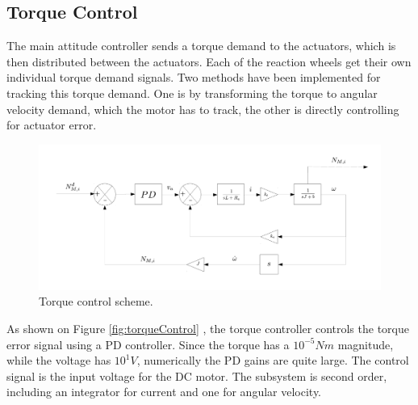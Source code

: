 \subsection{Torque Control}

The main attitude controller sends a torque demand to the actuators, which is then distributed between the actuators. Each of the reaction wheels get their own individual torque demand signals. Two methods have been implemented for tracking this torque demand. One is by transforming the torque to angular velocity demand, which the motor has to track, the other is directly controlling for actuator error.

\begin{figure}[h!]
	\centering 
	\includegraphics[width=170mm]{figures/torqueControl.pdf}	
	\caption{Torque control scheme.}
	\label{label{fig:torqueControl}}
\end{figure}

As shown on Figure \ref{fig:torqueControl} , the torque controller controls the torque error signal using a PD controller. Since the torque has a $ 10^{-5} Nm$ magnitude, while the voltage has $ 10^1 V$, numerically the PD gains are quite large. The control signal is the input voltage for the DC motor. The subsystem is second order, including an integrator for current and one for angular velocity.

